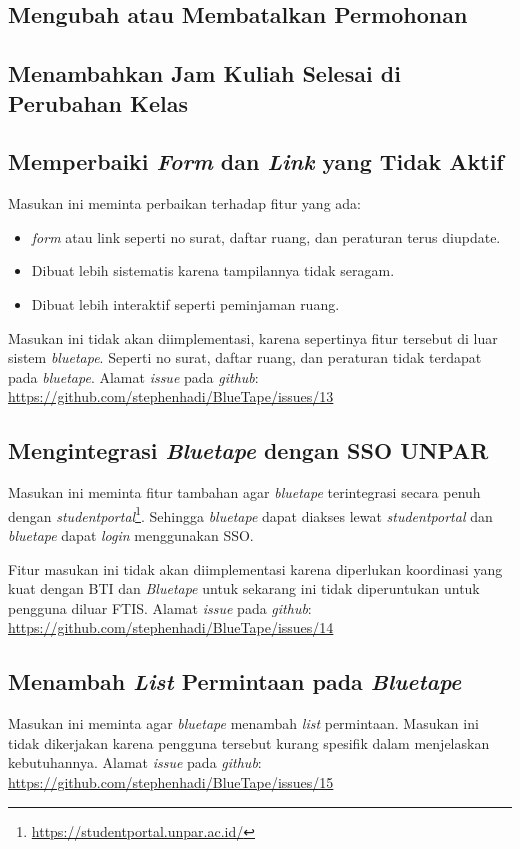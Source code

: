 \subsection{Mengubah atau Membatalkan Permohonan}
\label{issue:11}
\subsection{Menambahkan Jam Kuliah Selesai di Perubahan Kelas}
\label{issue:12}

\subsection{Memperbaiki \textit{Form} dan \textit{Link} yang Tidak Aktif}
\label{issue:13}
Masukan ini meminta perbaikan terhadap fitur yang ada: 
\begin{itemize}
	\item \textit{form} atau link seperti no surat, daftar ruang, dan peraturan terus diupdate.
	\item Dibuat lebih sistematis karena tampilannya tidak seragam.
	\item Dibuat lebih interaktif seperti peminjaman ruang.
\end{itemize}   

Masukan ini tidak akan diimplementasi, karena sepertinya fitur tersebut di luar sistem \textit{bluetape}. Seperti no surat, daftar ruang, dan peraturan tidak terdapat pada \textit{bluetape}. Alamat \textit{issue} pada \textit{github}: \url{https://github.com/stephenhadi/BlueTape/issues/13} 

\subsection{Mengintegrasi \textit{Bluetape} dengan SSO UNPAR}
\label{issue:14}
Masukan ini meminta fitur tambahan agar \textit{bluetape} terintegrasi secara penuh dengan \textit{studentportal}\footnote{\url{https://studentportal.unpar.ac.id/}}. Sehingga \textit{bluetape} dapat diakses lewat \textit{studentportal} dan \textit{bluetape} dapat \textit{login} menggunakan SSO.

Fitur masukan ini tidak akan diimplementasi karena diperlukan koordinasi yang kuat dengan BTI dan \textit{Bluetape} untuk sekarang ini tidak diperuntukan untuk pengguna diluar FTIS. Alamat \textit{issue} pada \textit{github}: \url{https://github.com/stephenhadi/BlueTape/issues/14} 

\subsection{Menambah \textit{List} Permintaan pada \textit{Bluetape}}
\label{issue:15}
Masukan ini meminta agar \textit{bluetape} menambah \textit{list} permintaan. Masukan ini tidak dikerjakan karena pengguna tersebut kurang spesifik dalam menjelaskan kebutuhannya. Alamat \textit{issue} pada \textit{github}: \url{https://github.com/stephenhadi/BlueTape/issues/15} 

